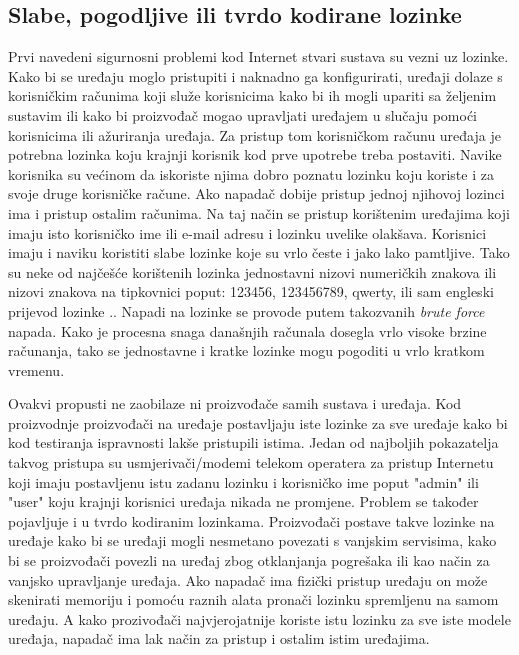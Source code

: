 \documentclass[times, utf8, diplomski]{fer}
\begin{document}
\subsection{Slabe, pogodljive ili tvrdo kodirane lozinke}
Prvi navedeni sigurnosni problemi kod Internet stvari sustava su vezni uz lozinke. Kako bi se uređaju moglo pristupiti i naknadno ga konfigurirati, uređaji dolaze s korisničkim računima koji služe korisnicima kako bi ih mogli upariti sa željenim sustavim ili kako bi proizvođač mogao upravljati uređajem u slučaju pomoći korisnicima ili ažuriranja uređaja. Za pristup tom korisničkom računu uređaja je potrebna lozinka koju krajnji korisnik kod prve upotrebe treba postaviti. Navike korisnika su većinom da iskoriste njima dobro poznatu lozinku koju koriste i za svoje druge korisničke račune. Ako napadač dobije pristup jednoj njihovoj lozinci ima i pristup ostalim računima. Na taj način se pristup korištenim uređajima koji imaju isto korisničko ime ili e-mail adresu i lozinku uvelike olakšava. Korisnici imaju i naviku koristiti slabe lozinke koje su vrlo česte i jako lako pamtljive. Tako su neke od najčešće korištenih lozinka jednostavni nizovi numeričkih znakova ili nizovi znakova na tipkovnici poput: 123456, 123456789, qwerty, ili sam engleski prijevod lozinke .\citep{pass1}. Napadi na lozinke se provode putem takozvanih \emph{brute force} napada. Kako je procesna snaga današnjih računala dosegla vrlo visoke brzine računanja, tako se jednostavne i kratke lozinke mogu pogoditi u vrlo kratkom vremenu.

Ovakvi propusti ne zaobilaze ni proizvođače samih sustava i uređaja. Kod proizvodnje proizvođači na uređaje postavljaju iste lozinke za sve uređaje kako bi kod testiranja ispravnosti lakše pristupili istima. Jedan od najboljih pokazatelja takvog pristupa su usmjerivači/modemi telekom operatera za pristup Internetu koji imaju postavljenu istu zadanu lozinku i korisničko ime poput "admin" ili "user" koju krajnji korisnici uređaja nikada ne promjene. Problem se također pojavljuje i u tvrdo kodiranim  lozinkama. Proizvođači postave takve lozinke na uređaje kako bi se uređaji mogli nesmetano povezati s vanjskim servisima, kako bi se proizvođači povezli na uređaj zbog otklanjanja pogrešaka ili kao način za vanjsko upravljanje uređaja. Ako napadač ima fizički pristup uređaju on može skenirati memoriju i pomoću raznih alata pronači lozinku spremljenu na samom uređaju. A kako prozivođači najvjerojatnije koriste istu lozinku za sve iste modele uređaja, napadač ima lak način za pristup i ostalim istim uređajima.
\end{document}
